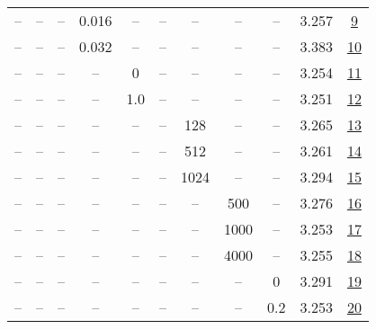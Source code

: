 \begin{table}[H]
\begin{tabular}{ccccccccccc}
-- & -- & -- & 0.016 & -- & -- & -- & -- & -- & 3.257 & \href{https://wandb.ai/stanford-mercury/optimizer-scaling/runs/sweep-130m-21B-cautiousa3617alr0.016-wd0.1-minlr0-warmup2000-b10-3a0195}{9} \\
-- & -- & -- & 0.032 & -- & -- & -- & -- & -- & 3.383 & \href{https://wandb.ai/stanford-mercury/optimizer-scaling/runs/sweep-130m-21B-cautious18fb14lr0.032-wd0.1-minlr0-warmup2000-b10-39c7ec}{10} \\
-- & -- & -- & -- & 0 & -- & -- & -- & -- & 3.254 & \href{https://wandb.ai/stanford-mercury/optimizer-scaling/runs/sweep-130m-21B-cautiousacb30clr0.008-wd0.1-minlr0-warmup2000-b10-f5c3ec}{11} \\
-- & -- & -- & -- & 1.0 & -- & -- & -- & -- & 3.251 & \href{https://wandb.ai/stanford-mercury/optimizer-scaling/runs/sweep-130m-21B-cautious9f3333lr0.008-wd0.1-minlr0-warmup2000-b10-79e29a}{12} \\
-- & -- & -- & -- & -- & -- & 128 & -- & -- & 3.265 & \href{https://wandb.ai/stanford-mercury/optimizer-scaling/runs/sweep-130m-21B-cautious7f34fclr0.008-wd0.1-minlr0-warmup2000-b10-8dc760}{13} \\
-- & -- & -- & -- & -- & -- & 512 & -- & -- & 3.261 & \href{https://wandb.ai/stanford-mercury/optimizer-scaling/runs/sweep-130m-21B-cautiousce8123lr0.008-wd0.1-minlr0-warmup2000-b10-f22bf2}{14} \\
-- & -- & -- & -- & -- & -- & 1024 & -- & -- & 3.294 & \href{https://wandb.ai/stanford-mercury/optimizer-scaling/runs/sweep-130m-21B-cautiousg8d0e3elr0.008-wd0.1-minlr0-warmup2000-b1-5e9931}{15} \\
-- & -- & -- & -- & -- & -- & -- & 500 & -- & 3.276 & \href{https://wandb.ai/stanford-mercury/optimizer-scaling/runs/sweep-130m-21B-cautiouse3206alr0.008-wd0.1-minlr0-warmup500-b10.-dac756}{16} \\
-- & -- & -- & -- & -- & -- & -- & 1000 & -- & 3.253 & \href{https://wandb.ai/stanford-mercury/optimizer-scaling/runs/sweep-130m-21B-cautious5dcd54lr0.008-wd0.1-minlr0-warmup1000-b10-65ad1c}{17} \\
-- & -- & -- & -- & -- & -- & -- & 4000 & -- & 3.255 & \href{https://wandb.ai/stanford-mercury/optimizer-scaling/runs/sweep-130m-21B-cautiousbb1d57lr0.008-wd0.1-minlr0-warmup4000-b10-fc3fbd}{18} \\
-- & -- & -- & -- & -- & -- & -- & -- & 0 & 3.291 & \href{https://wandb.ai/stanford-mercury/optimizer-scaling/runs/sweep-130m-21B-cautious530be0lr0.008-wd0-minlr0-warmup2000-b10.9-93b35d}{19} \\
-- & -- & -- & -- & -- & -- & -- & -- & 0.2 & 3.253 & \href{https://wandb.ai/stanford-mercury/optimizer-scaling/runs/sweep-130m-21B-cautiousf3c81clr0.008-wd0.2-minlr0-warmup2000-b10-b5ec73}{20} \\
\bottomrule
\end{tabular}
\end{table}

